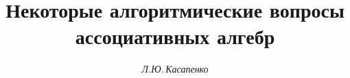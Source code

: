 








\newcommand{\Span}{\operatorname{Span}}


\newcommand{\Mod}{\operatorname{mod}}


\newcommand{\tts}[1]{}


\renewcommand{\baselinestretch}{1.02}







\setcounter{page}{36}















\author{\it Л.Ю.\,Касапенко}




\title{Некоторые алгоритмические вопросы\\ ассоциативных алгебр}





\date{}




\pagestyle{plain} %







\maketitle


\label{begin}











